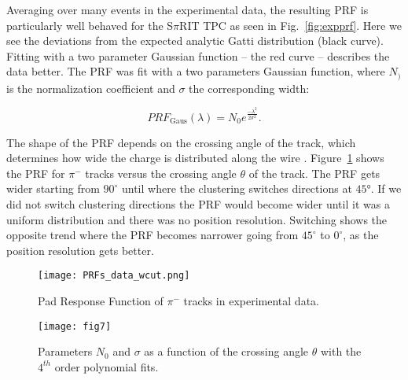 Averaging over many events in the experimental data, the resulting PRF is particularly well behaved for the S$\pi$RIT TPC as seen in Fig.~\ref{fig:expprf}. Here we see the deviations from the expected analytic Gatti distribution (black curve). Fitting with a two parameter Gaussian function -- the red curve -- describes the data better. The PRF was fit with a two parameters Gaussian function, where $N_)$ is the normalization coefficient and $\sigma$ the corresponding width:

\begin{equation}\label{eq:gaus}
PRF_{\mathrm{Gaus}}(\lambda) = N_0 e^\frac{-\lambda^2}{2\sigma^2}.
\end{equation}

\begin{comment}
\begin{figure}[ht!]s
\begin{overpic}[width=\linewidth]{fig5.pdf}
\put(61,55){\contour{white}{ PRF${}_{\mathrm{Gaus}}(\lambda)$ eq. \ref{eq:gaus}  }}
\put(61,49){\contour{white}{ PRF${}_{\mathrm{Gatti}}(\lambda)$ eq. \ref{eq:gatti} }}
\end{overpic}
\caption{Experimental pad response function of many events for a crossing angle of $85^{\circ} < \theta \leq 90^{\circ}$.  }
\label{fig:expprf}
\end{figure}
\end{comment}


The shape of the PRF depends on the crossing angle of the track, which determines how wide the charge is distributed along the wire \cite{gatti}. Figure~\ref{fig:prfpimData} shows the PRF for $\pi^-$ tracks versus the crossing angle $\theta$ of the track. The PRF gets wider starting from $90^{\circ}$  until where the clustering switches directions at $\ang{45}$. If we did not switch clustering directions the PRF would become wider until it was a uniform distribution and there was no position resolution. Switching shows the opposite trend where the PRF becomes narrower going from $45^{\circ}$ to $0^{\circ}$, as the position resolution gets better.

\begin{figure}[!htb]
     \centering
	 \texttt{[image: PRFs\_data\_wcut.png]}
     \caption{Pad Response Function of $\pi^-$ tracks in experimental data. }
     \label{fig:prfpimData}
\end{figure}

\begin{figure}[ht!]
\vspace{5mm}
\texttt{[image: fig7]}
\caption{Parameters $N_{0}$ and $\sigma$ as a function of the crossing angle $\theta$ with the $4^{th}$ order polynomial fits.}
\label{fig:normsigma}
\end{figure}

